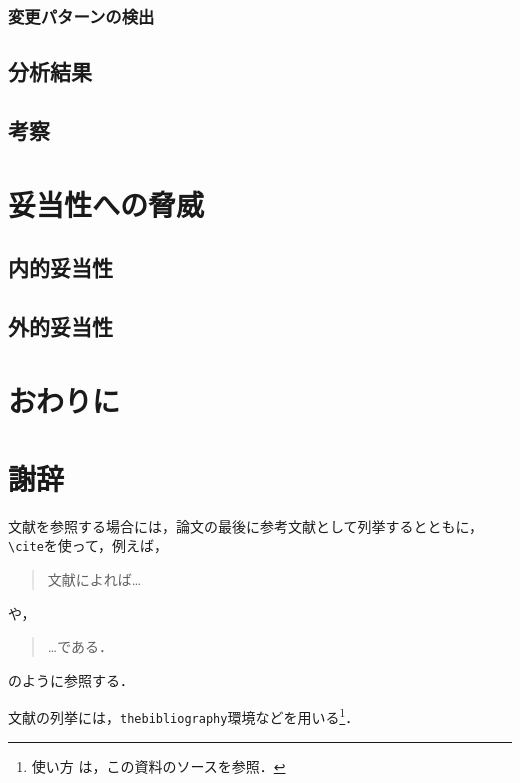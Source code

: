\documentclass[11pt,dvipdfmx]{jreport}
\begin{document}
\subsection{変更パターンの検出}

\section{分析結果}

\section{考察}

\chapter{妥当性への脅威}

\section{内的妥当性}

\section{外的妥当性}

\chapter{おわりに}

\chapter*{謝辞}

文献を参照する場合には，論文の最後に参考文献として列挙するとともに，
\verb|\cite|を使って，例えば，
\begin{quote}
  文献\cite{1390850475731067264}によれば…
\end{quote}
や，
\begin{quote}
  …である\cite{latex2e}．
\end{quote}
のように参照する．

文献の列挙には，{\tt thebibliography}環境などを用いる\footnote{使い方
  は，この資料のソースを参照．}．


\end{document}
